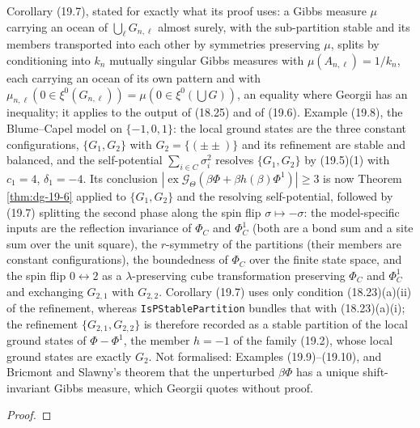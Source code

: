 \begin{theorem}
    Corollary (19.7), stated for exactly what its proof uses: a Gibbs measure $\mu$ carrying an
    ocean of $\bigcup_\ell G_{n,\ell}$ almost surely, with the sub-partition stable and its members
    transported into each other by symmetries preserving $\mu$, splits by conditioning into $k_n$
    mutually singular Gibbs measures with $\mu(A_{n,\ell}) = 1/k_n$, each carrying an ocean of its
    own pattern and with $\mu_{n,\ell}(0 \in \xi^0(G_{n,\ell})) = \mu(0 \in \xi^0(\bigcup G))$, an
    equality where Georgii has an inequality; it applies to the output of (18.25) and of (19.6).
    Example (19.8), the Blume--Capel model on $\{-1,0,1\}$: the local ground states are the three
    constant configurations, $\{G_1, G_2\}$ with $G_2 = \{(\pm\pm)\}$ and its refinement are stable
    and balanced, and the self-potential $\sum_{i\in C}\sigma_i^2$ resolves $\{G_1, G_2\}$ by (19.5)(1)
    with $c_1 = 4$, $\delta_1 = -4$. Its conclusion
    $|\operatorname{ex}\mathcal G_\Theta(\beta\Phi + \beta h(\beta)\Phi^1)| \geq 3$ is now Theorem
    \ref{thm:dg-19-6} applied to $\{G_1,G_2\}$ and the resolving self-potential, followed by (19.7)
    splitting the second phase along the spin flip $\sigma \mapsto -\sigma$: the model-specific
    inputs are the reflection invariance of $\Phi_C$ and $\Phi^1_C$ (both are a bond sum and a site
    sum over the unit square), the $r$-symmetry of the partitions (their members are constant
    configurations), the boundedness of $\Phi_C$ over the finite state space, and the spin flip
    $0 \leftrightarrow 2$ as a $\lambda$-preserving cube transformation preserving $\Phi_C$ and
    $\Phi^1_C$ and exchanging $G_{2,1}$ with $G_{2,2}$. Corollary (19.7) uses only condition
    (18.23)(a)(ii) of the refinement, whereas \texttt{IsPStablePartition} bundles that with
    (18.23)(a)(i); the refinement $\{G_{2,1}, G_{2,2}\}$ is therefore recorded as a stable partition
    of the local ground states of $\Phi - \Phi^1$, the member $h = -1$ of the family (19.2), whose
    local ground states are exactly $G_2$. Not formalised: Examples (19.9)--(19.10), and Bricmont
    and Slawny's theorem that the unperturbed $\beta\Phi$ has a unique shift-invariant Gibbs
    measure, which Georgii quotes without proof.
\end{theorem}
\begin{proof}
    \leanok
\end{proof}

